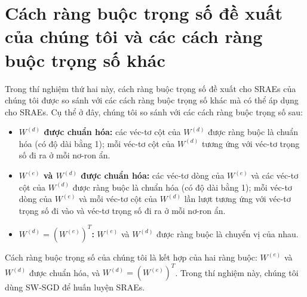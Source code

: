 \section{Cách ràng buộc trọng số đề xuất của chúng tôi và các cách ràng buộc trọng số khác}
Trong thí nghiệm thứ hai này, cách ràng buộc trọng số đề xuất cho SRAEs của chúng tôi được so sánh với các cách ràng buộc trọng số khác mà có thể áp dụng cho SRAEs. Cụ thể ở đây, chúng tôi so sánh với các cách ràng buộc trọng số sau:
\begin{itemize}
	\item \textbf{$W^{(d)}$ được chuẩn hóa:} các véc-tơ cột của $W^{(d)}$ được ràng buộc là chuẩn hóa (có độ dài bằng 1); mỗi véc-tơ cột của $W^{(d)}$ tương ứng với véc-tơ trọng số đi ra ở mỗi nơ-ron ẩn.
	\item \textbf{$W^{(e)}$ và $W^{(d)}$ được chuẩn hóa:} các véc-tơ dòng của $W^{(e)}$ và các véc-tơ cột của $W^{(d)}$ được ràng buộc là chuẩn hóa (có độ dài bằng 1); mỗi véc-tơ dòng của $W^{(e)}$ và mỗi véc-tơ cột của $W^{(d)}$ lần lượt tương ứng với véc-tơ trọng số đi vào và véc-tơ trọng số đi ra ở mỗi nơ-ron ẩn.
	\item \textbf{$W^{(d)} = (W^{(e)})^T$:} $W^{(e)}$ và $W^{(d)}$ được ràng buộc là chuyển vị của nhau.
\end{itemize}
Cách ràng buộc trọng số của chúng tôi là kết hợp của hai ràng buộc: $W^{(e)}$ và $W^{(d)}$ được chuẩn hóa, và $W^{(d)} = (W^{(e)})^T$. Trong thí nghiệm này, chúng tôi dùng SW-SGD để huấn luyện SRAEs.

